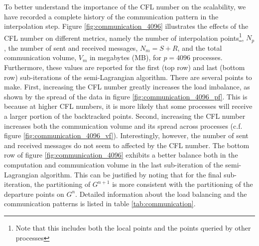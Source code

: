 To better understand the importance of the CFL number on the scalability, we have recorded a complete history of the communication pattern in the interpolation step. Figure \ref{fig:communication_4096} illustrates the effects of the CFL number on different metrics, namely the number of interpolation points\footnote{Note that this includes both the local points and the points queried by other processes}, $N_p$, the number of sent and received messages, $N_m = S + R$, and the total communication volume, $V_m$ in megabytes (MB), for $p=4096$ processes. Furthermore, these values are reported for the first (top row) and last (bottom row) sub-iterations of the semi-Lagrangian algorithm. There are several points to make. First, increasing the CFL number greatly increases the load imbalance, as shown by the spread of the data in figure \ref{fig:communication_4096_pf}. This is because at higher CFL numbers, it is more likely that some processes will receive a larger portion of the backtracked points. Second, increasing the CFL number increases both the communication volume and its spread across processes (c.f. figure \ref{fig:communication_4096_vf}). Interestingly, however, the number of sent and received messages do not seem to affected by the CFL number. The bottom row of figure \ref{fig:communication_4096} exhibits a better balance both in the computation and communication volume in the last sub-iteration of the semi-Lagrangian algorithm. This can be justified by noting that for the final sub-iteration, the partitioning of $G^{n+1}$ is more consistent with the partitioning of the departure points on $G^n$. Detailed information about the load balancing and the communication patterns is listed in table \ref{tab:communication}.
